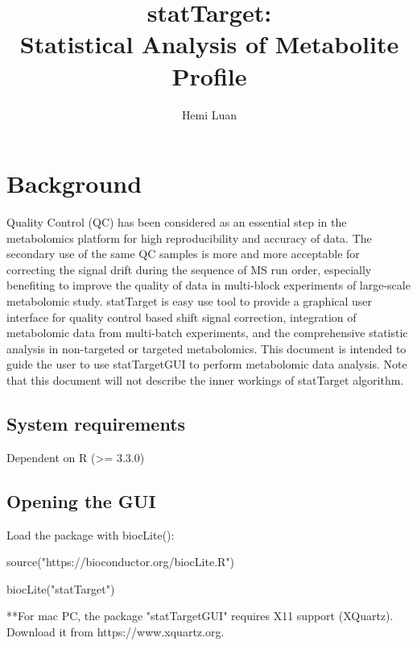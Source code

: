 \documentclass[english]{article}
\begin{document}


\author{Hemi Luan}

\title{statTarget:\\Statistical Analysis of Metabolite Profile}


\maketitle

\tableofcontents
 
\newpage

\section{Background}

Quality Control (QC) has been considered as an essential step in the
metabolomics platform for high reproducibility and accuracy of data. 
The secondary use of the same QC samples is more and more acceptable for 
correcting the signal drift during the sequence of MS run order, 
especially benefiting to improve the quality of data in multi-block 
experiments of large-scale metabolomic study. statTarget is easy use tool 
to provide a graphical user interface for quality control based 
shift signal correction, integration of metabolomic data from multi-batch 
experiments, and the comprehensive statistic analysis in 
non-targeted or targeted metabolomics.
This document is intended to guide the user to use statTargetGUI to 
perform metabolomic data analysis. Note that this document will 
not describe the inner workings 
of statTarget algorithm.

\subsection{System requirements}

Dependent on R (>= 3.3.0)


\subsection{Opening the GUI}
 
Load the package with biocLite():

source("https://bioconductor.org/biocLite.R")

biocLite("statTarget")

**For mac PC, the package "statTargetGUI" requires X11 support (XQuartz). 
Download it from https://www.xquartz.org.
\end{document}
